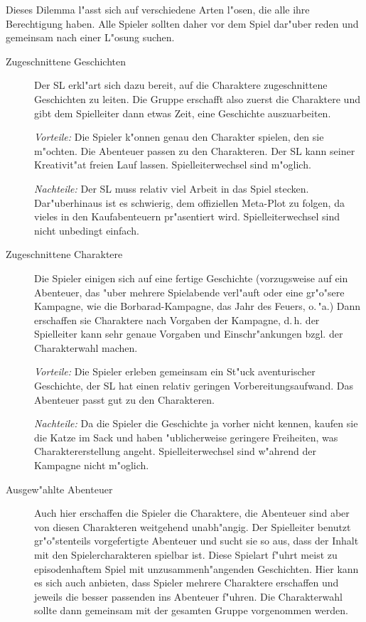 Dieses Dilemma l"asst sich auf verschiedene Arten l"osen, die alle ihre Berechtigung haben. Alle Spieler sollten daher vor dem Spiel dar"uber reden und gemeinsam nach einer L"osung suchen.
\begin{description}
  \item[Zugeschnittene Geschichten] Der SL erkl"art sich dazu bereit, auf die Charaktere zugeschnittene Geschichten zu leiten. Die Gruppe erschafft also zuerst die Charaktere und gibt dem Spielleiter dann etwas Zeit, eine Geschichte auszuarbeiten. 

  \emph{Vorteile:} Die Spieler k"onnen genau den Charakter spielen, den sie m"ochten. Die Abenteuer passen zu den Charakteren. Der SL kann seiner Kreativit"at freien Lauf lassen. Spielleiterwechsel sind m"oglich.

  \emph{Nachteile:} Der SL muss relativ viel Arbeit in das Spiel stecken. Dar"uberhinaus ist es schwierig, dem offiziellen Meta-Plot zu folgen, da vieles in den Kaufabenteuern pr"asentiert wird. Spielleiterwechsel sind nicht unbedingt einfach.

  \item[Zugeschnittene Charaktere] Die Spieler einigen sich auf eine fertige Geschichte (vorzugsweise auf ein Abenteuer, das "uber mehrere Spielabende verl"auft oder eine gr"o"sere Kampagne, wie die Borbarad-Kampagne, das Jahr des Feuers, o.\,"a.) Dann erschaffen sie Charaktere nach Vorgaben der Kampagne, d.\,h. der Spielleiter kann sehr genaue Vorgaben und Einschr"ankungen bzgl. der Charakterwahl machen.

  \emph{Vorteile:} Die Spieler erleben gemeinsam ein St"uck aventurischer Geschichte, der SL hat einen relativ geringen Vorbereitungsaufwand. Das Abenteuer passt gut zu den Charakteren.

  \emph{Nachteile:} Da die Spieler die Geschichte ja vorher nicht kennen, kaufen sie die Katze im Sack und haben "ublicherweise geringere Freiheiten, was Charaktererstellung angeht. Spielleiterwechsel sind w"ahrend der Kampagne nicht m"oglich.

  \item[Ausgew"ahlte Abenteuer] Auch hier erschaffen die Spieler die Charaktere, die Abenteuer sind aber von diesen Charakteren weitgehend unabh"angig. Der Spielleiter benutzt gr"o"stenteils vorgefertigte Abenteuer und sucht sie so aus, dass der Inhalt mit den Spielercharakteren spielbar ist. Diese Spielart f"uhrt meist zu episodenhaftem Spiel mit unzusammenh"angenden Geschichten. Hier kann es sich auch anbieten, dass Spieler mehrere Charaktere erschaffen und jeweils die besser passenden ins Abenteuer f"uhren. Die Charakterwahl sollte dann gemeinsam mit der gesamten Gruppe vorgenommen werden.


\end{description}
